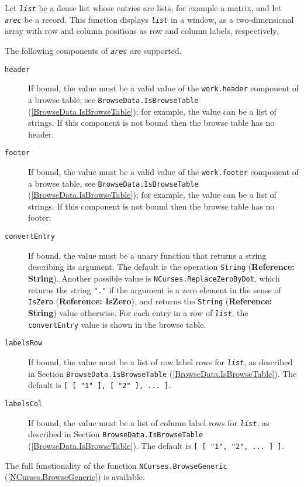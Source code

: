 \documentclass[a4paper,11pt]{report}
\begin{document}
{{{ Let \mbox{\texttt{\mdseries\slshape list}} be a dense list whose entries are lists, for example a matrix, and let \mbox{\texttt{\mdseries\slshape arec}} be a record. This function displays \mbox{\texttt{\mdseries\slshape list}} in a window, as a two-dimensional array with row and column positions as row
and column labels, respectively. 

 The following components of \mbox{\texttt{\mdseries\slshape arec}} are supported. 
\begin{description}
\item[{\texttt{header}}]  If bound, the value must be a valid value of the \texttt{work.header} component of a browse table, see \texttt{BrowseData.IsBrowseTable} (\ref{BrowseData.IsBrowseTable}); for example, the value can be a list of strings. If this component is not
bound then the browse table has no header. 
\item[{\texttt{footer}}]  If bound, the value must be a valid value of the \texttt{work.footer} component of a browse table, see \texttt{BrowseData.IsBrowseTable} (\ref{BrowseData.IsBrowseTable}); for example, the value can be a list of strings. If this component is not
bound then the browse table has no footer. 
\item[{\texttt{convertEntry}}]  If bound, the value must be a unary function that returns a string describing
its argument. The default is the operation \texttt{String} (\textbf{Reference: String}). Another possible value is \texttt{NCurses.ReplaceZeroByDot}, which returns the string \texttt{"."} if the argument is a zero element in the sense of \texttt{IsZero} (\textbf{Reference: IsZero}), and returns the \texttt{String} (\textbf{Reference: String}) value otherwise. For each entry in a row of \mbox{\texttt{\mdseries\slshape list}}, the \texttt{convertEntry} value is shown in the browse table. 
\item[{\texttt{labelsRow}}]  If bound, the value must be a list of row label rows for \mbox{\texttt{\mdseries\slshape list}}, as described in Section \texttt{BrowseData.IsBrowseTable} (\ref{BrowseData.IsBrowseTable}). The default is \texttt{[ [ "1" ], [ "2" ], ... ]}. 
\item[{\texttt{labelsCol}}]  If bound, the value must be a list of column label rows for \mbox{\texttt{\mdseries\slshape list}}, as described in Section \texttt{BrowseData.IsBrowseTable} (\ref{BrowseData.IsBrowseTable}). The default is \texttt{[ [ "1", "2", ... ] ]}. 
\end{description}
 

 The full functionality of the function \texttt{NCurses.BrowseGeneric} (\ref{NCurses.BrowseGeneric}) is available. }

}}
\end{document}
